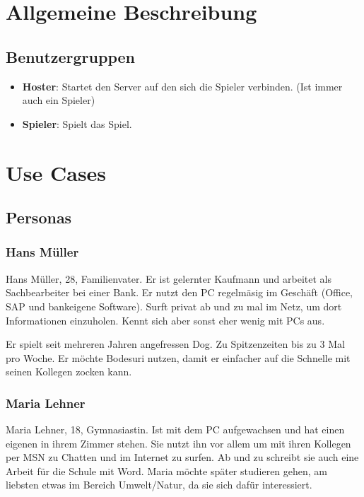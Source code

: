 \documentclass[a4paper,12pt,halfparskip,DIV14]{scrartcl}
\begin{document}


\section{Allgemeine Beschreibung}\label{sec:allgemeine_beschreibung} %
\subsection{Benutzergruppen}\label{sec:benutzergruppen} %
\begin{itemize}
	\item \textbf{Hoster}: Startet den Server auf den sich die Spieler verbinden. (Ist immer auch ein Spieler)
	\item \textbf{Spieler}: Spielt das Spiel.
\end{itemize}

\section{Use Cases}

\subsection{Personas}\label{sec:personas} %
\subsubsection{Hans Müller}\label{sub:hans_müller} %
Hans Müller, 28, Familienvater. Er ist gelernter Kaufmann und arbeitet als Sachbearbeiter bei einer Bank. Er nutzt den PC regelmäsig im Geschäft (Office, SAP und bankeigene Software). Surft privat ab und zu mal im Netz, um dort Informationen einzuholen. Kennt sich aber sonst eher wenig mit PCs aus. 

Er spielt seit mehreren Jahren angefressen Dog. Zu Spitzenzeiten bis zu 3 Mal pro Woche. Er möchte Bodesuri nutzen, damit er einfacher auf die Schnelle mit seinen Kollegen zocken kann. 

\subsubsection{Maria Lehner}\label{sub:maria_lehner} %
Maria Lehner, 18, Gymnasiastin. Ist mit dem PC aufgewachsen und hat einen eigenen in ihrem Zimmer stehen. Sie nutzt ihn vor allem um mit ihren Kollegen per MSN zu Chatten und im Internet zu surfen. Ab und zu schreibt sie auch eine Arbeit für die Schule mit Word. Maria möchte später studieren gehen, am liebsten etwas im Bereich Umwelt/Natur, da sie sich dafür interessiert. 
\end{document}
